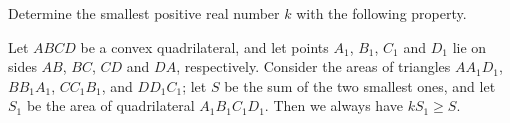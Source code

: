 Determine the smallest positive real number $k$ with the following property.

Let $ABCD$ be a convex quadrilateral, and let points $A_1$, $B_1$, $C_1$ and $D_1$ lie on sides $AB$, $BC$, $CD$ and $DA$, respectively. Consider the areas of triangles $AA_1D_1$, $BB_1A_1$, $CC_1B_1$, and $DD_1C_1$; let $S$ be the sum of the two smallest ones, and let $S_1$ be the area of quadrilateral $A_1B_1C_1D_1$. Then we always have $kS_1 \geq S$.
